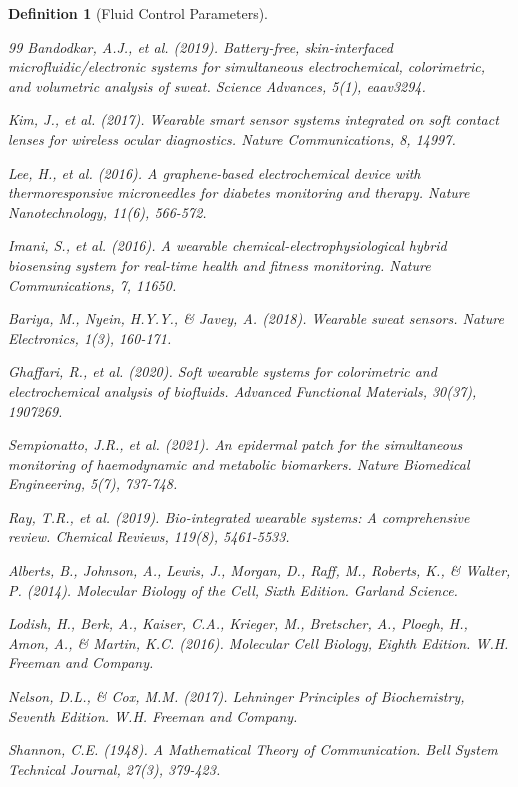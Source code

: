 \documentclass[12pt,a4paper]{article}
\newtheorem{definition}{Definition}
\begin{document}
\begin{definition}[Fluid Control Parameters]
\begin{thebibliography}{99}
Bandodkar, A.J., et al. (2019). Battery-free, skin-interfaced microfluidic/electronic systems for simultaneous electrochemical, colorimetric, and volumetric analysis of sweat. \textit{Science Advances}, 5(1), eaav3294.

Kim, J., et al. (2017). Wearable smart sensor systems integrated on soft contact lenses for wireless ocular diagnostics. \textit{Nature Communications}, 8, 14997.

Lee, H., et al. (2016). A graphene-based electrochemical device with thermoresponsive microneedles for diabetes monitoring and therapy. \textit{Nature Nanotechnology}, 11(6), 566-572.

Imani, S., et al. (2016). A wearable chemical-electrophysiological hybrid biosensing system for real-time health and fitness monitoring. \textit{Nature Communications}, 7, 11650.

Bariya, M., Nyein, H.Y.Y., \& Javey, A. (2018). Wearable sweat sensors. \textit{Nature Electronics}, 1(3), 160-171.

Ghaffari, R., et al. (2020). Soft wearable systems for colorimetric and electrochemical analysis of biofluids. \textit{Advanced Functional Materials}, 30(37), 1907269.

Sempionatto, J.R., et al. (2021). An epidermal patch for the simultaneous monitoring of haemodynamic and metabolic biomarkers. \textit{Nature Biomedical Engineering}, 5(7), 737-748.

Ray, T.R., et al. (2019). Bio-integrated wearable systems: A comprehensive review. \textit{Chemical Reviews}, 119(8), 5461-5533.

Alberts, B., Johnson, A., Lewis, J., Morgan, D., Raff, M., Roberts, K., \& Walter, P. (2014). Molecular Biology of the Cell, Sixth Edition. Garland Science.

Lodish, H., Berk, A., Kaiser, C.A., Krieger, M., Bretscher, A., Ploegh, H., Amon, A., \& Martin, K.C. (2016). Molecular Cell Biology, Eighth Edition. W.H. Freeman and Company.

Nelson, D.L., \& Cox, M.M. (2017). Lehninger Principles of Biochemistry, Seventh Edition. W.H. Freeman and Company.

Shannon, C.E. (1948). A Mathematical Theory of Communication. Bell System Technical Journal, 27(3), 379-423.


\end{thebibliography}
\end{definition}
\end{document}
